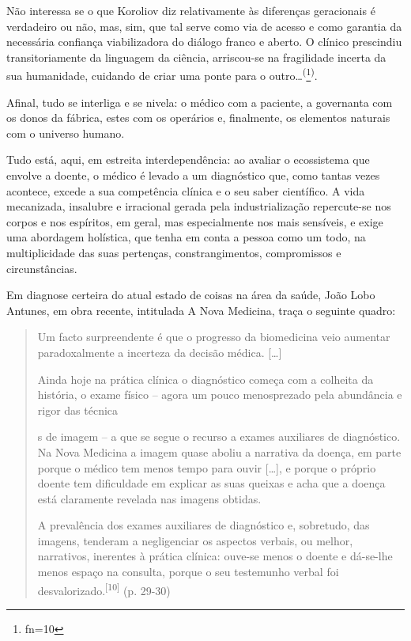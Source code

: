 \documentclass{article}
\makeatletter
\newcommand{\fn}{\afterassignment\fn@aux\count0=}
\newcommand{\fn@aux}{\csname fn\the\count0\endcsname}
\makeatother
\begin{document}
Não interessa se o que Koroliov diz relativamente às diferenças geracionais é
verdadeiro ou não, mas, sim, que tal serve como via de acesso e como garantia da
necessária confiança viabilizadora do diálogo franco e aberto. O clínico
prescindiu transitoriamente da linguagem da ciência, arriscou-se na fragilidade
incerta da sua humanidade, cuidando de criar uma ponte para o
outro…\textsuperscript{(}\footnote{\fn10}\textsuperscript{)}.

Afinal, tudo se interliga e se nivela: o médico com a paciente, a governanta com
os donos da fábrica, estes com os operários e, finalmente, os elementos naturais
com o universo humano.

Tudo está, aqui, em estreita interdependência: ao avaliar o ecossistema que
envolve a doente, o médico é levado a um diagnóstico que, como tantas vezes
acontece, excede a sua competência clínica e o seu saber científico. A vida
mecanizada, insalubre e irracional gerada pela industrialização repercute-se nos
corpos e nos espíritos, em geral, mas especialmente nos mais sensíveis, e exige
uma abordagem holística, que tenha em conta a pessoa como um todo, na
multiplicidade das suas pertenças, constrangimentos, compromissos e
circunstâncias.

Em diagnose certeira do atual estado de coisas na área da saúde, João Lobo
Antunes, em obra recente, intitulada A Nova Medicina, traça o seguinte quadro:
\begin{quote}

Um facto surpreendente é que o progresso da biomedicina veio aumentar
paradoxalmente a incerteza da decisão médica. […]

Ainda hoje na prática clínica o diagnóstico começa com a colheita da história, o
exame físico – agora um pouco menosprezado pela abundância e rigor das técnica

s de imagem – a que se segue o recurso a exames auxiliares de diagnóstico. Na
Nova Medicina a imagem quase aboliu a narrativa da doença, em parte porque o
médico tem menos tempo para ouvir […], e porque o próprio doente tem dificuldade
em explicar as suas queixas e acha que a doença está claramente revelada nas
imagens obtidas.

A prevalência dos exames auxiliares de diagnóstico e, sobretudo, das imagens,
tenderam a negligenciar os aspectos verbais, ou melhor, narrativos, inerentes à
prática clínica: ouve-se menos o doente e dá-se-lhe menos espaço na consulta,
porque o seu testemunho verbal foi
desvalorizado.\textsuperscript{[}\textsuperscript{10}\textsuperscript{]}
(p. 29-30)

\end{quote}
\end{document}
